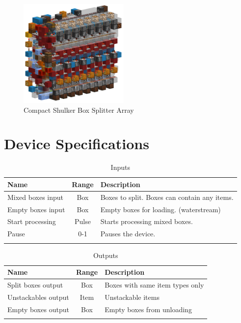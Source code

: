 \documentclass[10pt]{datasheet}
\begin{document}
\begin{figure}[H]
    \centering
    \includegraphics[width=0.48\textwidth]{area_render_20_.png}
    \caption{\centering Compact Shulker Box Splitter Array}
\end{figure}

\onecolumn

\section{Device Specifications}

\begin{table}[H]
    \caption{Inputs}
    \begin{tabularx}{\textwidth}{l | c | X}
        \thickhline
        \textbf{Name} & \textbf{Range} & \textbf{Description} \\
        \hline
        Mixed boxes input & Box & Boxes to split. Boxes can contain any items. \\
        \hline
        Empty boxes input & Box & Empty boxes for loading. (waterstream) \\
        \hline
        Start processing & Pulse & Starts processing mixed boxes. \\
        \hline
        Pause & 0-1 & Pauses the device. \\
        \thickhline
\end{tabularx}
\end{table}

\begin{table}[H]
    \caption{Outputs}
    \begin{tabularx}{\textwidth}{l | c | X}
        \thickhline
        \textbf{Name} & \textbf{Range} & \textbf{Description} \\
        \hline
        Split boxes output & Box & Boxes with same item types only \\
        \hline
        Unstackables output & Item & Unstackable items \\
        \hline
        Empty boxes output & Box & Empty boxes from unloading \\
        \thickhline
\end{tabularx}
\end{table}
\end{document}
